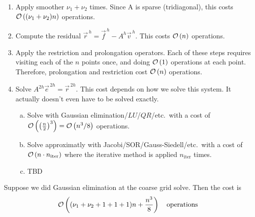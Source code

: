 \begin{enumerate}[1)]
\item Apply smoother $\nu_1 + \nu_2$ times. Since A is sparse (tridiagonal),
  this costs $\mathcal{O}\left((\nu_1 + \nu_2)n\right)$ operations. 
\item Compute the residual $\vec{r}^{\,h} = \vec{f}^{\,h} - A^h\vec{v}^{\,h}$.
  This costs $\mathcal{O}\left(n\right)$ operations.
\item Apply the restriction and prolongation operators. Each of these steps
  requires visiting each of the $n$ points once, and doing $\mathcal{O}\left(1\right)$ operations
  at each point. Therefore, prolongation and restriction cost $\mathcal{O}\left(n\right)$
  operations.
\item Solve $A^{2h}\vec{e}^{\,2h} = \vec{r}^{\,2h}$. This cost depends on how we
  solve this system. It actually doesn't even have to be solved exactly. 
  \begin{enumerate}[a)]
  \item Solve with Gaussian elimination/$LU$/$QR$/etc.\ with a cost of
    $\mathcal{O}\left(\left(\frac{n}{2}\right)^3\right) = \mathcal{O}\left(n^3/8\right)$ operations.
  \item Solve approximatly with Jacobi/SOR/Gauss-Siedell/etc.\ 
    with a cost of $\mathcal{O}\left(n\cdot n_{\text{iter}}\right)$ where the iterative method is
    applied $n_{\text{iter}}$ times. 
  \item TBD
  \end{enumerate}
\end{enumerate}

Suppose we did Gaussian elimination at the coarse grid solve. Then the cost is
\vspace{2em}
\begin{equation*}
\mathcal{O}\left( (\tikzmark{nu1}\nu_1 + \tikzmark{nu2}\nu_2 + \tikzmark{resid}1 + \tikzmark{restrict}1 + \tikzmark{prolong}1)n + \frac{n^3}{8} \right) \quad\text{operations}
\end{equation*}

{
\color{red}

}

